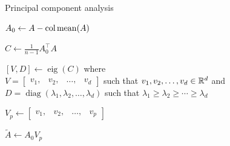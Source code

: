 \begin{algorithm}
    \everymath{\displaystyle}
    \caption{Principal component analysis}
    \label{alg:principal-component-analysis}

    \(A_0 \gets A - \operatorname{col\,mean}(A)\)\;

    \(C \gets \frac{1}{n-1} A_0^\top A\)\;

    \([V, D] \gets \operatorname{eig}(C)\)
    where \\[4pt]
    \(V = \begin{bmatrix}
        v_1, & v_2, & \dots, & v_d
    \end{bmatrix}\)
    such that \(v_1, v_2, \dots, v_d \in \mathbb{R}^d\) and \\[4pt]
    \(D = \operatorname{diag}(\lambda_1, \lambda_2, \dots, \lambda_d)\)
    such that \(\lambda_1 \geq \lambda_2 \geq \cdots \geq \lambda_d\)\;

    \(V_p \gets \begin{bmatrix}
        v_1, & v_2, & \dots, & v_p
    \end{bmatrix}\)\;

    \(\tilde{A} \gets A_0 V_p\)\;
\end{algorithm}


